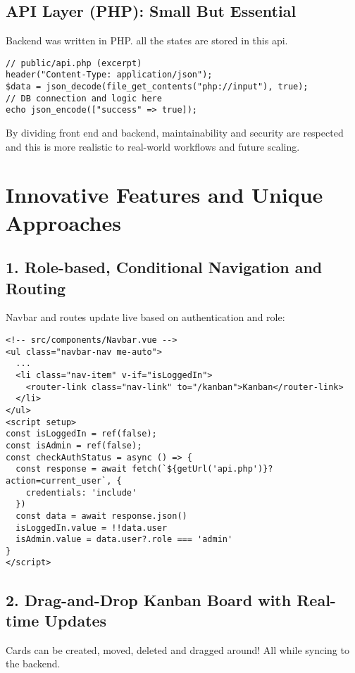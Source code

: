 \documentclass[11pt,a4paper]{article}
\begin{document}
\subsection*{API Layer (PHP): Small But Essential}

Backend was written in PHP. all the states are stored in this api.

\begin{verbatim}
// public/api.php (excerpt)
header("Content-Type: application/json");
$data = json_decode(file_get_contents("php://input"), true);
// DB connection and logic here
echo json_encode(["success" => true]);
\end{verbatim}


By dividing front end and backend, maintainability and security are respected and this is more realistic to real-world workflows and future scaling.

\section*{Innovative Features and Unique Approaches}

\subsection*{1. Role-based, Conditional Navigation and Routing}
Navbar and routes update live based on authentication and role:

\begin{verbatim}
<!-- src/components/Navbar.vue -->
<ul class="navbar-nav me-auto">
  ...
  <li class="nav-item" v-if="isLoggedIn">
    <router-link class="nav-link" to="/kanban">Kanban</router-link>
  </li>
</ul>
<script setup>
const isLoggedIn = ref(false);
const isAdmin = ref(false);
const checkAuthStatus = async () => {
  const response = await fetch(`${getUrl('api.php')}?action=current_user`, {
    credentials: 'include'
  })
  const data = await response.json()
  isLoggedIn.value = !!data.user
  isAdmin.value = data.user?.role === 'admin'
}
</script>
\end{verbatim}

\subsection*{2. Drag-and-Drop Kanban Board with Real-time Updates}
Cards can be created, moved, deleted and dragged around! All while syncing to the backend.
\end{document}
